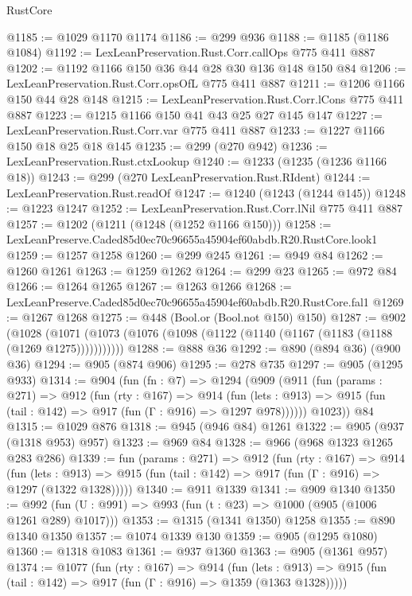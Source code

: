\begin{lexlean}{RustCore}
\begin{coremodule}
@1185 := @1029 @1170 @1174
@1186 := @299 @936
@1188 := @1185 (@1186 @1084)
@1192 := LexLeanPreservation.Rust.Corr.callOps @775 @411 @887
@1202 := @1192 @1166 @150 @36 @44 @28 @30 @136 @148 @150 @84
@1206 := LexLeanPreservation.Rust.Corr.opsOfL @775 @411 @887
@1211 := @1206 @1166 @150 @44 @28 @148
@1215 := LexLeanPreservation.Rust.Corr.lCons @775 @411 @887
@1223 := @1215 @1166 @150 @41 @43 @25 @27 @145 @147
@1227 := LexLeanPreservation.Rust.Corr.var @775 @411 @887
@1233 := @1227 @1166 @150 @18 @25 @18 @145
@1235 := @299 (@270 @942)
@1236 := LexLeanPreservation.Rust.ctxLookup
@1240 := @1233 (@1235 (@1236 @1166 @18))
@1243 := @299 (@270 LexLeanPreservation.Rust.RIdent)
@1244 := LexLeanPreservation.Rust.readOf
@1247 := @1240 (@1243 (@1244 @145))
@1248 := @1223 @1247
@1252 := LexLeanPreservation.Rust.Corr.lNil @775 @411 @887
@1257 := @1202 (@1211 (@1248 (@1252 @1166 @150)))
@1258 := LexLeanPreserve.Caded85d0ec70c96655a45904ef60abdb.R20.RustCore.look1
@1259 := @1257 @1258
@1260 := @299 @245
@1261 := @949 @84
@1262 := @1260 @1261
@1263 := @1259 @1262
@1264 := @299 @23
@1265 := @972 @84
@1266 := @1264 @1265
@1267 := @1263 @1266
@1268 := LexLeanPreserve.Caded85d0ec70c96655a45904ef60abdb.R20.RustCore.fal1
@1269 := @1267 @1268
@1275 := @448 (Bool.or (Bool.not @150) @150)
@1287 := @902
    (@1028 (@1071 (@1073 (@1076 (@1098 (@1122 (@1140 (@1167 (@1183 (@1188 (@1269 @1275)))))))))))
@1288 := @888 @36
@1292 := @890 (@894 @36) (@900 @36)
@1294 := @905 (@874 @906)
@1295 := @278 @735
@1297 := @905 (@1295 @933)
@1314 := @904
    (fun (fn : @7) =>
    @1294
      (@909
        (@911
          (fun (params : @271) =>
          @912
            (fun (rty : @167) =>
            @914
              (fun (lets : @913) =>
              @915 (fun (tail : @142) => @917 (fun (Γ : @916) => @1297 @978))))))
        @1023))
    @84
@1315 := @1029 @876
@1318 := @945 (@946 @84) @1261
@1322 := @905 (@937 (@1318 @953) @957)
@1323 := @969 @84
@1328 := @966 (@968 @1323 @1265 @283 @286)
@1339 := fun (params : @271) =>
  @912
    (fun (rty : @167) =>
    @914
      (fun (lets : @913) =>
      @915 (fun (tail : @142) => @917 (fun (Γ : @916) => @1297 (@1322 @1328)))))
@1340 := @911 @1339
@1341 := @909 @1340
@1350 := @992 (fun (U : @991) => @993 (fun (t : @23) => @1000 (@905 (@1006 @1261 @289) @1017)))
@1353 := @1315 (@1341 @1350) @1258
@1355 := @890 @1340 @1350
@1357 := @1074 @1339 @130
@1359 := @905 (@1295 @1080)
@1360 := @1318 @1083
@1361 := @937 @1360
@1363 := @905 (@1361 @957)
@1374 := @1077
    (fun (rty : @167) =>
    @914
      (fun (lets : @913) =>
      @915 (fun (tail : @142) => @917 (fun (Γ : @916) => @1359 (@1363 @1328)))))

\end{coremodule}
\end{lexlean}
